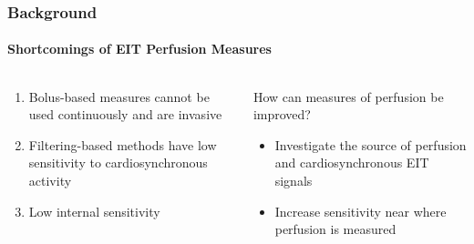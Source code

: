 \documentclass[10pt,    %
    english,            %
    xcolor=table,       %
    envcountsect,        %
    aspectratio=1610
]{beamer}
\begin{document}
\begin{frame}
	\frametitle{Background}
	\framesubtitle{Shortcomings of EIT Perfusion Measures}
	\begin{columns}[c]
		\begin{column}{0.5\textwidth}
			\begin{enumerate}
				\item Bolus-based measures cannot be used continuously and are invasive
				\item Filtering-based methods have low sensitivity to cardiosynchronous activity
				\item Low internal sensitivity 
			\end{enumerate}
		\end{column}
		\begin{column}{0.5\textwidth}
			How can measures of \alert{perfusion} be improved? 
			\begin{itemize}
				\item Investigate the source of perfusion and cardiosynchronous EIT signals
				\item Increase sensitivity near where perfusion is measured
			\end{itemize}
		\end{column}
		\end{columns}	
\end{frame}
\end{document}
